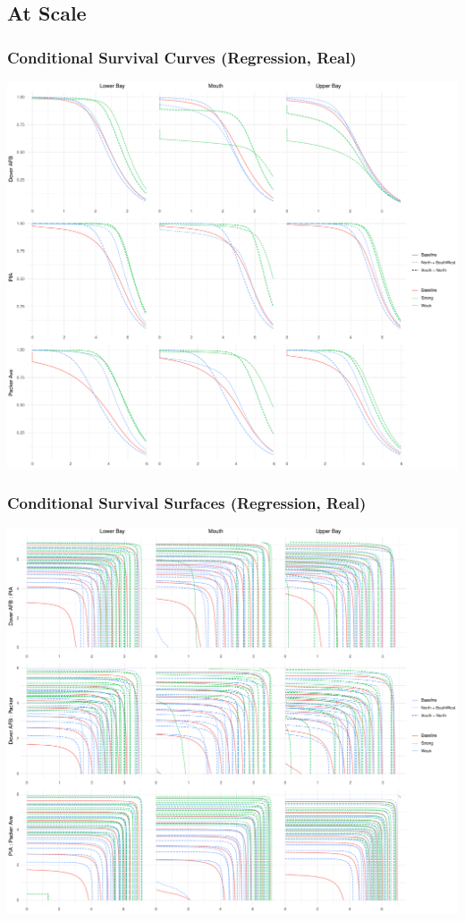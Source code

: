 \documentclass[aspectratio=169,10pt]{beamer}
\newlength{\frametextheight}
\begin{document}
\subsection*{At Scale}

\begin{frame}
    \frametitle{Conditional Survival Curves (Regression, Real)}
    \begin{center}
        \includegraphics[height=0.99\frametextheight]{./ch3/plots/condsurv_reg/condsurv_reg_1d_real}
    \end{center}
\end{frame}

\begin{frame}
    \frametitle{Conditional Survival Surfaces (Regression, Real)}
    \begin{center}
        \includegraphics[height=0.99\frametextheight]{./ch3/plots/condsurv_reg/condsurv_reg_2d_real}
    \end{center}
\end{frame}
\end{document}
